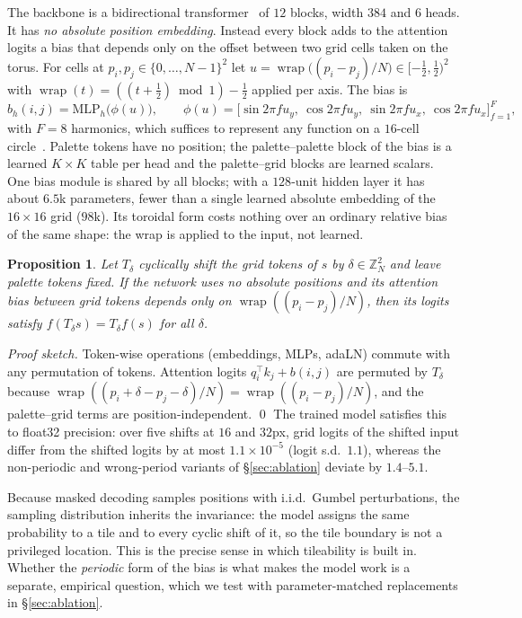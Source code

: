 \documentclass{article}
\newtheorem{proposition}{Proposition}
\newcommand{\wrapop}{\operatorname{wrap}}
\begin{document}
The backbone is a bidirectional transformer~\citep{vaswani2017attention} of
$12$ blocks, width $384$ and $6$ heads. It has \emph{no absolute position
embedding}. Instead every block adds to the attention logits a bias that
depends only on the offset between two grid cells taken on the torus. For
cells at $p_i,p_j\in\{0,\dots,N-1\}^2$ let
$u = \wrapop\!\big((p_i-p_j)/N\big)\in[-\tfrac12,\tfrac12)^2$ with
$\wrapop(t)=((t+\tfrac12)\bmod 1)-\tfrac12$ applied per axis. The bias is
\begin{equation}
  b_h(i,j) = \mathrm{MLP}_h\big(\phi(u)\big),\qquad
  \phi(u) = \big[\sin 2\pi f u_y,\ \cos 2\pi f u_y,\ \sin 2\pi f u_x,\ \cos 2\pi f u_x\big]_{f=1}^{F},
  \label{eq:bias}
\end{equation}
with $F=8$ harmonics, which suffices to represent any function on a $16$-cell
circle~\citep{tancik2020fourier}. Palette tokens have no position; the
palette--palette block of the bias is a learned $K\times K$ table per head and
the palette--grid blocks are learned scalars. One bias module is shared by all
blocks; with a $128$-unit hidden layer it has about $6.5$k parameters,
fewer than a single learned absolute embedding of the $16\times16$ grid
($98$k). Its toroidal form costs nothing over an ordinary relative bias of the
same shape: the wrap is applied to the input, not learned.

\begin{proposition}
Let $T_\delta$ cyclically shift the grid tokens of $s$ by $\delta\in\mathbb{Z}_N^2$
and leave palette tokens fixed. If the network uses no absolute positions and
its attention bias between grid tokens depends only on $\wrapop((p_i-p_j)/N)$,
then its logits satisfy $f(T_\delta s)=T_\delta f(s)$ for all $\delta$.
\end{proposition}
\emph{Proof sketch.} Token-wise operations (embeddings, MLPs, adaLN) commute
with any permutation of tokens. Attention logits $q_i^\top k_j+b(i,j)$ are
permuted by $T_\delta$ because $\wrapop((p_i+\delta-p_j-\delta)/N)=\wrapop((p_i-p_j)/N)$,
and the palette--grid terms are position-independent. \qed
The trained model satisfies this to float32 precision: over five shifts at
$16$ and $32$px, grid logits of the shifted input differ from the shifted
logits by at most $1.1\times10^{-5}$ (logit s.d.\ $1.1$), whereas the
non-periodic and wrong-period variants of \S\ref{sec:ablation} deviate by
$1.4$--$5.1$.

Because masked decoding samples positions with i.i.d.\ Gumbel perturbations,
the sampling distribution inherits the invariance: the model assigns the same
probability to a tile and to every cyclic shift of it, so the tile boundary is
not a privileged location. This is the precise sense in which
tileability is built in. Whether the \emph{periodic} form of the bias is what
makes the model work is a separate, empirical question, which we test with
parameter-matched replacements in \S\ref{sec:ablation}.
\end{document}
